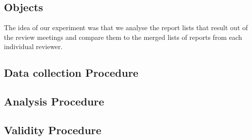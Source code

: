 \subsection{Objects}

The idea of our experiment was that we analyse the report lists that result out of the review meetings and compare them to the merged lists of reports from each individual reviewer.

\subsection{Data collection Procedure}

\subsection{Analysis Procedure}

\subsection{Validity Procedure}